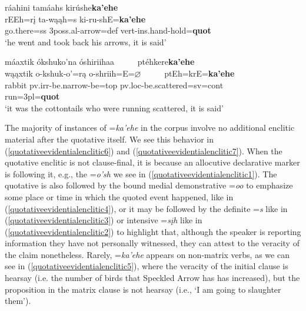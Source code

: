 \begin{exe}
\begin{xlist}
	\item\label{quotativeevidentialenclitic6}
	\glll ráahini tamáahs kirúshe\textbf{ka'ehe}\\
	rEEh=rį ta-wąąh=s ki-ru-shE=\textbf{ka'ehe}\\
	\textnormal{go.there}=ss 3poss.al-\textnormal{arrow}=def vert-ins.hand-\textnormal{hold}=\textbf{quot}\\
	\glt `he went and took back his arrows, it is said' \citep[16]{hollow1973a}

	\item\label{quotativeevidentialenclitic7}
	\glll	máaxtik ókshuko'na óshiriihaa ~ ~ ~  ptéhkere\textbf{ka'ehe}\\
	wąąxtik o-kshuk-o'=rą o-shriih=E=$\varnothing$ ~ ~ ~  ptEh=krE=\textbf{ka'ehe}\\
	\textnormal{rabbit} pv.irr-\textnormal{be.narrow}-\textnormal{be}=top pv.loc-\textnormal{be.scattered}=sv=cont ~ ~ ~  \textnormal{run}=3pl=\textbf{quot}\\
	\glt `it was the cottontails who were running scattered, it is said' \citep[17]{hollow1973a}
	
	\end{xlist}

\end{exe}

The majority of instances of =\textit{ka'ehe} in the corpus involve no additional enclitic material after the quotative itself. We see this behavior in (\ref{quotativeevidentialenclitic6}) and (\ref{quotativeevidentialenclitic7}). When the quotative enclitic is not clause-final, it is because an allocutive declarative marker is following it, e.g., the =\textit{o'sh} we see in (\ref{quotativeevidentialenclitic1}). The quotative is also followed by the bound medial demonstrative =\textit{oo} to emphasize some place or time in which the quoted event happened, like in (\ref{quotativeevidentialenclitic4}), or it may be followed by the definite =\textit{s} like in (\ref{quotativeevidentialenclitic3}) or intensive =\textit{sįh} like in (\ref{quotativeevidentialenclitic2}) to highlight that, although the speaker is reporting information they have not personally witnessed, they can attest to the veracity of the claim nonetheless. Rarely, =\textit{ka'ehe} appears on non-matrix verbs, as we can see in (\ref{quotativeevidentialenclitic5}), where the veracity of the initial clause is hearsay (i.e. the number of birds that Speckled Arrow has has increased), but the proposition in the matrix clause is not hearsay (i.e., `I am going to slaughter them').

